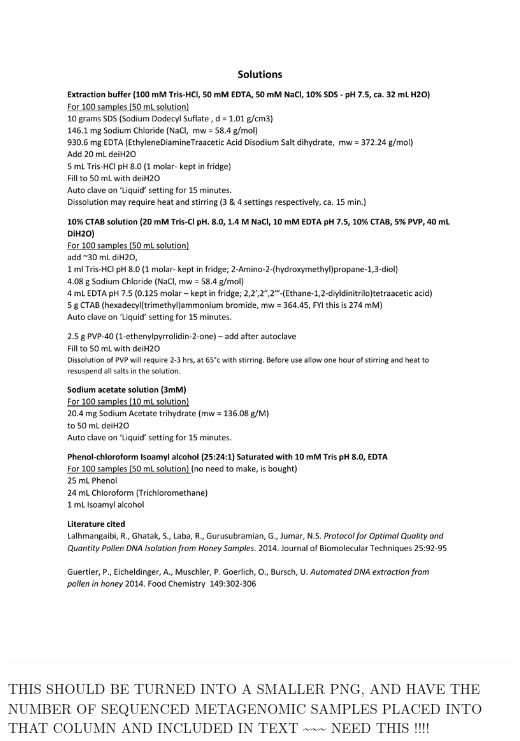 \documentclass[
]{article}
\begin{document}
\newpage

\includegraphics{../graphics/assorted/pollen_ctab-1.pdf}

\newpage

THIS SHOULD BE TURNED INTO A SMALLER PNG, AND HAVE THE NUMBER OF
SEQUENCED METAGENOMIC SAMPLES PLACED INTO THAT COLUMN AND INCLUDED IN
TEXT \textasciitilde\textasciitilde\textasciitilde{} NEED THIS !!!!
\end{document}
